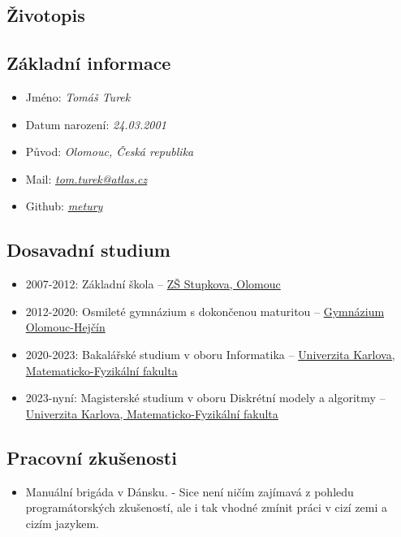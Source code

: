 \documentclass{article}
\begin{document}
\begin{center}
	\section*{Životopis}
\end{center}

\subsection*{Základní informace}

\begin{itemize}
	\item Jméno: \textit{Tomáš Turek}
	\item Datum narození: \textit{24.03.2001}
	\item Původ: \textit{Olomouc, Česká republika}
	\item Mail: \href{mailto:tom.turek@atlas.cz}{\textit{tom.turek@atlas.cz}}
	\item Github: \href{https://github.com/metury}{\textit{metury}}
\end{itemize}

\subsection*{Dosavadní studium}

\begin{itemize}
	\item 2007-2012: Základní škola -- \href{https://zsstupkova.cz/}{ZŠ Stupkova, Olomouc}
	\item 2012-2020: Osmileté gymnázium s dokončenou maturitou -- \href{https://www.gytool.cz/}{Gymnázium Olomouc-Hejčín} 
	\item 2020-2023: Bakalářské studium v oboru Informatika -- \href{https://www.mff.cuni.cz/}{Univerzita Karlova, Matematicko-Fyzikální fakulta}
	\item 2023-nyní: Magisterské studium v oboru Diskrétní modely a algoritmy -- \href{https://www.mff.cuni.cz/}{Univerzita Karlova, Matematicko-Fyzikální fakulta}
\end{itemize}

\subsection*{Pracovní zkušenosti}

\begin{itemize}
\item Manuální brigáda v Dánsku. - Sice není ničím zajímavá z pohledu programátorských zkušeností, ale i tak vhodné zmínit práci v cizí zemi a cizím jazykem.
\end{itemize}
\end{document}
